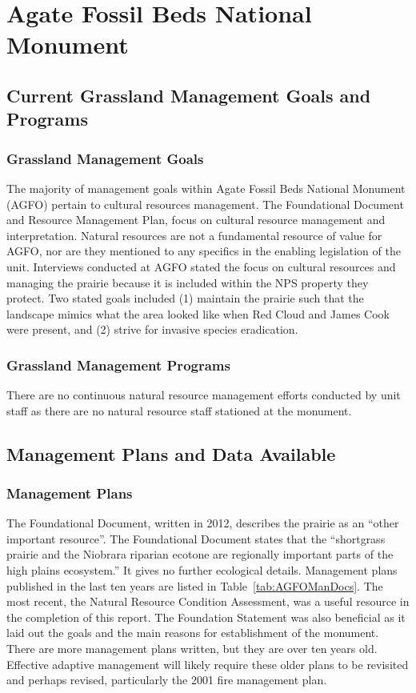 \section{Agate Fossil Beds National Monument}

\subsection{Current Grassland Management Goals and Programs}

\subsubsection{Grassland Management Goals}

The majority of management goals within Agate Fossil Beds National Monument (AGFO) pertain to cultural resources management. 
The Foundational Document and Resource Management Plan, focus on cultural resource management and interpretation. 
Natural resources are not a fundamental resource of value for AGFO, nor are they mentioned to any specifics in the enabling legislation of the unit. 
Interviews conducted at AGFO stated the focus on cultural resources and managing the prairie because it is included within the NPS property they protect. 
Two stated goals included (1) maintain the prairie such that the landscape mimics what the area looked like when Red Cloud and James Cook were present, and (2) strive for invasive species eradication.

\subsubsection{Grassland Management Programs}

There are no continuous natural resource management efforts conducted by
unit staff as there are no natural resource staff stationed at the
monument.

\subsection{Management Plans and Data Available}

\subsubsection{Management Plans}

The Foundational Document, written in 2012, describes the prairie as an ``other important resource''. 
The Foundational Document states that the ``shortgrass prairie and the Niobrara riparian ecotone are regionally important parts of the high plains ecosystem.'' 
It gives no further ecological details. 
Management plans published in the last ten years are listed in Table~\ref{tab:AGFOManDocs}. 
The most recent, the Natural Resource Condition Assessment, was a useful resource in the completion of this report. 
The Foundation Statement was also beneficial as it laid out the goals and the main reasons for establishment of the monument. 
There are more management plans written, but they are over ten years old.
Effective adaptive management will likely require these older plans to be revisited and perhaps revised, particularly the 2001 fire management plan.

